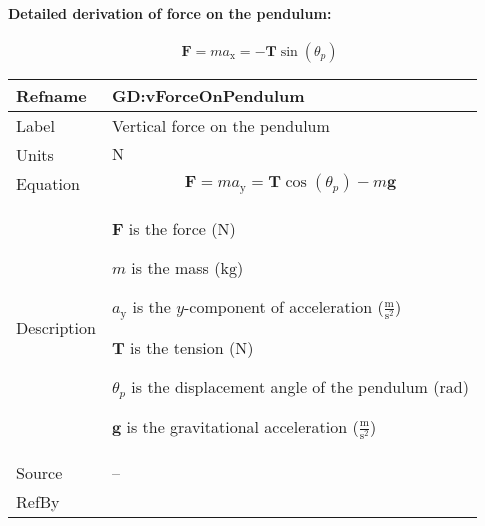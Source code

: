 \documentclass[12pt]{article}
\begin{document}
\paragraph{Detailed derivation of force on the pendulum:}
\label{GD:hForceOnPendulumDeriv}
\begin{displaymath}
\symbf{F}=m {a_{\text{x}}}=-\symbf{T} \sin\left({θ_{p}}\right)
\end{displaymath}
\vspace{\baselineskip}
\noindent
\begin{minipage}{\textwidth}
\begin{tabular}{>{\raggedright}p{}>{\raggedright\arraybackslash}p{}}
\toprule \textbf{Refname} & \textbf{GD:vForceOnPendulum}
\label{GD:vForceOnPendulum}
\\ \midrule
Label & Vertical force on the pendulum
        
\\ \midrule
Units & ${\text{N}}$
        
\\ \midrule
Equation & \begin{displaymath}
           \symbf{F}=m {a_{\text{y}}}=\symbf{T} \cos\left({θ_{p}}\right)-m \symbf{g}
           \end{displaymath}
\\ \midrule
Description & \begin{symbDescription}
              \item{$\symbf{F}$ is the force (${\text{N}}$)}
              \item{$m$ is the mass (${\text{kg}}$)}
              \item{${a_{\text{y}}}$ is the $y$-component of acceleration ($\frac{\text{m}}{\text{s}^{2}}$)}
              \item{$\symbf{T}$ is the tension (${\text{N}}$)}
              \item{${θ_{p}}$ is the displacement angle of the pendulum (${\text{rad}}$)}
              \item{$\symbf{g}$ is the gravitational acceleration ($\frac{\text{m}}{\text{s}^{2}}$)}
              \end{symbDescription}
\\ \midrule
Source & --
         
\\ \midrule
RefBy & 
\\ \bottomrule
\end{tabular}
\end{minipage}
\end{document}
